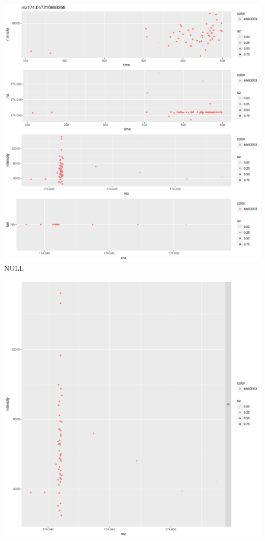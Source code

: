 \documentclass[]{article}
\newenvironment{Shaded}{\begin{snugshade}}{\end{snugshade}}
\newcommand{\KeywordTok}[1]{\textcolor[rgb]{0.13,0.29,0.53}{\textbf{#1}}}
\newcommand{\DataTypeTok}[1]{\textcolor[rgb]{0.13,0.29,0.53}{#1}}
\newcommand{\OperatorTok}[1]{\textcolor[rgb]{0.81,0.36,0.00}{\textbf{#1}}}
\newcommand{\NormalTok}[1]{#1}
\begin{document}
\includegraphics{Supplementary_document_files/figure-latex/cluster.mz.174-2.pdf}
NULL

\begin{Shaded}
\end{Shaded}

\includegraphics{Supplementary_document_files/figure-latex/cluster.mz.174-3.pdf}
\end{document}
